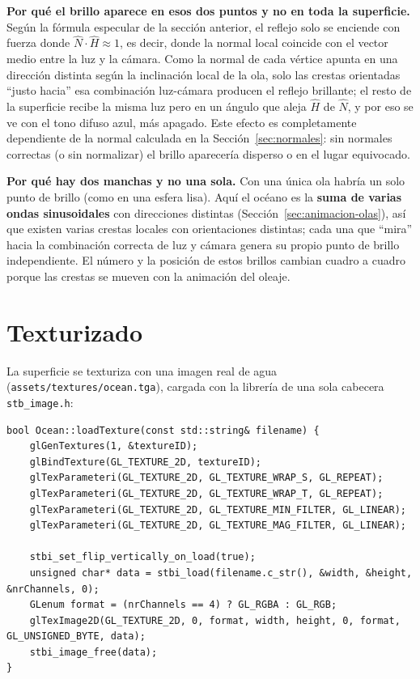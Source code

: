 ﻿\documentclass[11pt]{article}
\begin{document}
\textbf{Por qué el brillo aparece en esos dos puntos y no en toda la
superficie.} Según la fórmula especular de la sección anterior, el reflejo
solo se enciende con fuerza donde $\hat N \cdot \hat H \approx 1$, es decir,
donde la normal local coincide con el vector medio entre la luz y la cámara.
Como la normal de cada vértice apunta en una dirección distinta según la
inclinación local de la ola, solo las crestas orientadas ``justo hacia'' esa
combinación luz-cámara producen el reflejo brillante; el resto de la
superficie recibe la misma luz pero en un ángulo que aleja $\hat H$ de
$\hat N$, y por eso se ve con el tono difuso azul, más apagado. Este efecto es
completamente dependiente de la normal calculada en la
Sección~\ref{sec:normales}: sin normales correctas (o sin normalizar) el
brillo aparecería disperso o en el lugar equivocado.

\textbf{Por qué hay dos manchas y no una sola.} Con una única ola habría un
solo punto de brillo (como en una esfera lisa). Aquí el océano es la
\textbf{suma de varias ondas sinusoidales} con direcciones distintas
(Sección~\ref{sec:animacion-olas}), así que existen varias crestas locales con
orientaciones distintas; cada una que ``mira'' hacia la combinación correcta
de luz y cámara genera su propio punto de brillo independiente. El número y
la posición de estos brillos cambian cuadro a cuadro porque las crestas se
mueven con la animación del oleaje.

\section{Texturizado}

La superficie se texturiza con una imagen real de agua
(\texttt{assets/textures/ocean.tga}), cargada con la librería de una sola
cabecera \texttt{stb\_image.h}:

\begin{lstlisting}
bool Ocean::loadTexture(const std::string& filename) {
    glGenTextures(1, &textureID);
    glBindTexture(GL_TEXTURE_2D, textureID);
    glTexParameteri(GL_TEXTURE_2D, GL_TEXTURE_WRAP_S, GL_REPEAT);
    glTexParameteri(GL_TEXTURE_2D, GL_TEXTURE_WRAP_T, GL_REPEAT);
    glTexParameteri(GL_TEXTURE_2D, GL_TEXTURE_MIN_FILTER, GL_LINEAR);
    glTexParameteri(GL_TEXTURE_2D, GL_TEXTURE_MAG_FILTER, GL_LINEAR);

    stbi_set_flip_vertically_on_load(true);
    unsigned char* data = stbi_load(filename.c_str(), &width, &height, &nrChannels, 0);
    GLenum format = (nrChannels == 4) ? GL_RGBA : GL_RGB;
    glTexImage2D(GL_TEXTURE_2D, 0, format, width, height, 0, format, GL_UNSIGNED_BYTE, data);
    stbi_image_free(data);
}
\end{lstlisting}
\end{document}
